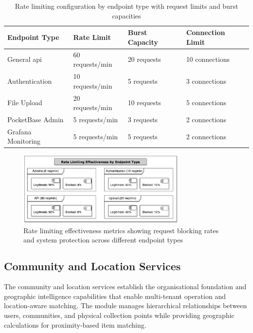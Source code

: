 \begin{table}[htbp]
    \centering
    \caption{Rate limiting configuration by endpoint type with request limits and burst capacities}
    \label{tab:rate_limiting_config}
    \begin{tabular}{@{}llll@{}}
        \toprule
        \textbf{Endpoint Type} & \textbf{Rate Limit} & \textbf{Burst Capacity} & \textbf{Connection Limit} \\
        \midrule
        General \ac{api} & 60 requests/min & 20 requests & 10 connections \\
        Authentication & 10 requests/min & 5 requests & 3 connections \\
        File Upload & 20 requests/min & 10 requests & 5 connections \\
        PocketBase Admin & 5 requests/min & 3 requests & 2 connections \\
        Grafana Monitoring & 5 requests/min & 5 requests & 2 connections \\
        \bottomrule
    \end{tabular}
\end{table}

\begin{figure}[htbp]
    \centering
    \includegraphics[width=0.75\textwidth]{figs/chapter4/rate_limiting_chart.png}
    \caption{Rate limiting effectiveness metrics showing request blocking rates and system protection across different endpoint types}
    \label{fig:rate_limiting_effectiveness}
\end{figure}

\subsection{Community and Location Services} \label{subsection:community_location_services}

The community and location services establish the organisational foundation and geographic intelligence capabilities that enable multi-tenant operation and location-aware matching. The module manages hierarchical relationships between users, communities, and physical collection points while providing geographic calculations for proximity-based item matching.

